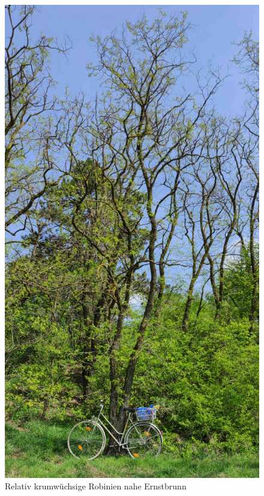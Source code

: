 \documentclass[twocolumn]{scrartcl}
\begin{document}
\begin{figure}[htbp]
  \centering
  \includegraphics[width=.9\linewidth]{./bild/roninieLokal}
  \caption{Relativ krumwüchsige Robinien nahe Ernstbrunn}
  \label{fig:robLokalErnstbrunn}
\end{figure}
\end{document}
